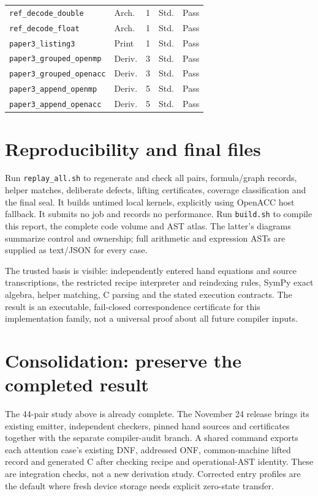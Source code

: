 \begin{longtable}{p{2.9in}lrlp{.65in}}
\texttt{ref\_\allowbreak decode\_\allowbreak double} & Arch. & 1 & Std. & Pass\\
\texttt{ref\_\allowbreak decode\_\allowbreak float} & Arch. & 1 & Std. & Pass\\
\texttt{paper3\_\allowbreak listing3} & Print & 1 & Std. & Pass\\
\texttt{paper3\_\allowbreak grouped\_\allowbreak openmp} & Deriv. & 3 & Std. & Pass\\
\texttt{paper3\_\allowbreak grouped\_\allowbreak openacc} & Deriv. & 3 & Std. & Pass\\
\texttt{paper3\_\allowbreak append\_\allowbreak openmp} & Deriv. & 5 & Std. & Pass\\
\texttt{paper3\_\allowbreak append\_\allowbreak openacc} & Deriv. & 5 & Std. & Pass\\
\bottomrule\end{longtable}\normalsize
\section{Reproducibility and final files}
Run \texttt{replay\_all.sh} to regenerate and check all pairs, formula/graph
records, helper matches, deliberate defects, lifting certificates, coverage
classification and the final seal. It builds untimed local kernels, explicitly
using OpenACC host fallback. It submits no job and records no performance.
Run \texttt{build.sh} to compile this report, the complete code volume and AST
atlas. The latter's diagrams summarize control and ownership; full arithmetic
and expression ASTs are supplied as text/JSON for every case.

The trusted basis is visible: independently entered hand equations and source
transcriptions, the restricted recipe interpreter and reindexing rules, SymPy
exact algebra, helper matching, C parsing and the stated execution contracts.
The result is an executable, fail-closed correspondence certificate for this
implementation family, not a universal proof about all future compiler inputs.

\nocite{paper1,paper2,paper3,paper4,paper5,openacc}

\section{Consolidation: preserve the completed result}
The 44-pair study above is already complete. The November 24 release brings its existing emitter, independent checkers, pinned hand sources and certificates together with the separate compiler-audit branch. A shared command exports each attention case's existing DNF, addressed ONF, common-machine lifted record and generated C after checking recipe and operational-AST identity. These are integration checks, not a new derivation study. Corrected entry profiles are the default where fresh device storage needs explicit zero-state transfer.


